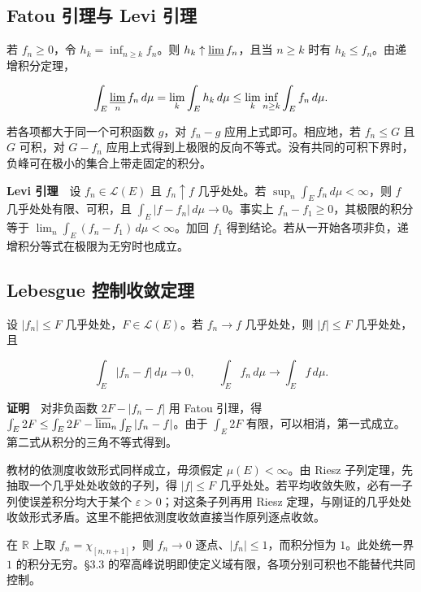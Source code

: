 \documentclass[11pt,a4paper]{article}
\begin{document}
\subsection*{Fatou 引理与 Levi 引理}\label{fatou-ux5f15ux7406ux4e0e-levi-ux5f15ux7406}

若 \(f_n\ge0\)，令 \(h_k=\inf_{n\ge k}f_n\)。则 \(h_k\uparrow\varliminf f_n\)，且当 \(n\ge k\) 时有 \(h_k\le f_n\)。由递增积分定理，

\[
\int_E\varliminf_n f_n\,d\mu
=\lim_k\int_E h_k\,d\mu
\le\lim_k\inf_{n\ge k}\int_E f_n\,d\mu.
\]

若各项都大于同一个可积函数 \(g\)，对 \(f_n-g\) 应用上式即可。相应地，若 \(f_n\le G\) 且 \(G\) 可积，对 \(G-f_n\) 应用上式得到上极限的反向不等式。没有共同的可积下界时，负峰可在极小的集合上带走固定的积分。

\textbf{Levi 引理}　设 \(f_n\in\mathcal L(E)\) 且 \(f_n\uparrow f\) 几乎处处。若 \(\sup_n\int_E f_n\,d\mu<\infty\)，则 \(f\) 几乎处处有限、可积，且 \(\int_E|f-f_n|\,d\mu\to0\)。事实上 \(f_n-f_1\ge0\)，其极限的积分等于 \(\lim_n\int_E(f_n-f_1)\,d\mu<\infty\)。加回 \(f_1\) 得到结论。若从一开始各项非负，递增积分等式在极限为无穷时也成立。

\subsection*{Lebesgue 控制收敛定理}\label{lebesgue-ux63a7ux5236ux6536ux655bux5b9aux7406}

设 \(|f_n|\le F\) 几乎处处，\(F\in\mathcal L(E)\)。若 \(f_n\to f\) 几乎处处，则 \(|f|\le F\) 几乎处处，且

\[
\int_E|f_n-f|\,d\mu\longrightarrow0,\qquad
\int_E f_n\,d\mu\longrightarrow\int_E f\,d\mu.
\]

\textbf{证明}　对非负函数 \(2F-|f_n-f|\) 用 Fatou 引理，得 \(\int_E2F\le\int_E2F-\varlimsup_n\int_E|f_n-f|\)。由于 \(\int_E2F\) 有限，可以相消，第一式成立。第二式从积分的三角不等式得到。

教材的依测度收敛形式同样成立，毋须假定 \(\mu(E)<\infty\)。由 Riesz 子列定理，先抽取一个几乎处处收敛的子列，得 \(|f|\le F\) 几乎处处。若平均收敛失败，必有一子列使误差积分均大于某个 \(\varepsilon>0\)；对这条子列再用 Riesz 定理，与刚证的几乎处处收敛形式矛盾。这里不能把依测度收敛直接当作原列逐点收敛。

在 \(\mathbb R\) 上取 \(f_n=\chi_{[n,n+1]}\)，则 \(f_n\to0\) 逐点、\(|f_n|\le1\)，而积分恒为 \(1\)。此处统一界 \(1\) 的积分无穷。§3.3 的窄高峰说明即使定义域有限，各项分别可积也不能替代共同控制。
\end{document}
